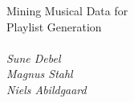 \thispagestyle{empty}

{\noindent \LARGE Mining Musical Data for\\Playlist Generation}
\vspace{1cm}
\\\\
\textit{\noindent Sune Debel \\ \noindent Magnus Stahl \\ \noindent Niels Abildgaard}
\newpage
